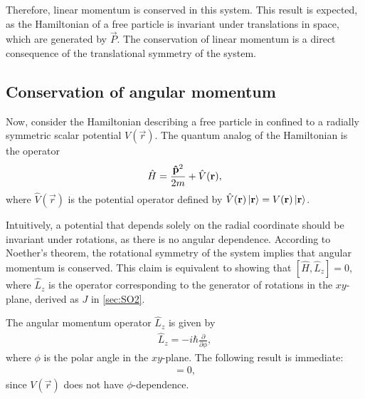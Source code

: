 Therefore, linear momentum is conserved in this system. This result is expected, as the Hamiltonian of a free particle is invariant under translations in space, which are generated by $\vec{P}$. The conservation of linear momentum is a direct consequence of the translational symmetry of the system.

\subsection{Conservation of angular momentum}\label{sub:cons_ang_mom}
Now, consider the Hamiltonian describing a free particle in confined to a radially symmetric scalar potential $V(\vec{r})$.
The quantum analog of the Hamiltonian is the operator
\begin{align}
    \hat{H} = \frac{\mathbf{\hat{p}}^2}{2m}  + \hat{V}(\mathbf{r}),
\end{align}
where $\hat{V}(\vec{r})$ is the potential operator defined by $\hat{V}(\mathbf{r})\ket{\mathbf{r}} = V(\mathbf{r})\ket{\mathbf{r}}$.

Intuitively, a potential that depends solely on the radial coordinate should be invariant under rotations, as there is no angular dependence. According to Noether's theorem, the rotational symmetry of the system implies that angular momentum is conserved. This claim is equivalent to showing that $[\hat{H},\hat{L}_z] = 0$, where $\hat{L}_z$ is the operator corresponding to the generator of rotations in the $xy$-plane, derived as $J$ in \cref{sec:SO2}.

The angular momentum operator $\hat{L}_z$ is given by
\begin{align}
    \hat{L}_z = -i\hbar \frac{\partial}{\partial\phi},
\end{align}
where $\phi$ is the polar angle in the $xy$-plane. The following result is immediate:
\begin{align}
    [V(\vec{r}),\hat{L}_z] = 0,
\end{align}
since $V(\vec{r})$ does not have $\phi$-dependence.


